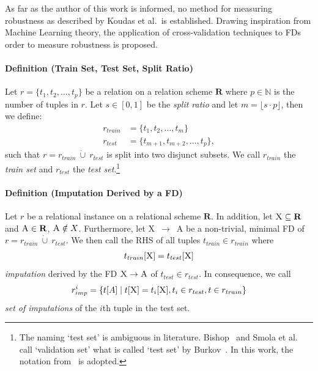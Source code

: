 As far as the author of this work is informed, no method for measuring robustness as described by Koudas et al.\ is established.
Drawing inspiration from Machine Learning theory, the application of cross-validation techniques to FDs order to measure robustness is proposed.

\paragraph{Definition (Train Set, Test Set, Split Ratio)} Let \( r = \{ t_1, t_2, \dots, t_p \}\) be a  relation on a relation scheme \( \boldsymbol{R} \) where \( p \in \mathbb{N} \) is the number of tuples in \( r \).
Let \( s \in [0, 1] \) be the \emph{split ratio} and let \( m = \lfloor s \cdot p \rfloor \), then we define:
\begin{align}
    r_{train} &= \{ t_1, t_2, \dots, t_{m} \} \\
    r_{test} &= \{ t_{m + 1}, t_{m + 2}, \dots, t_{p} \},
\end{align}
such that \( r =  r_{train}~\dot\cup~r_{test} \) is split into two disjunct subsets.
We call \( r_{train} \) the \emph{train set} and \( r_{test} \) the \emph{test set}.\footnote{The naming `test set' is ambiguous in literature. Bishop~\cite{BIS06} and Smola et al.\ \cite{SMO08} call `validation set' what is called `test set' by Burkov~\cite[ch.~5, p.~8-9]{BUR19}. In this work, the notation from~\cite{BUR19} is adopted.}~\cite[p.~56]{SMO08}

\paragraph{Definition (Imputation Derived by a FD)}
Let \( r \) be a relational instance on a relational scheme \( \mathbf{R} \).
In addition, let \( \textsc{X} \subseteq \mathbf{R} \) and \( \textsc{A} \in \mathbf{R} \), \( \textsc{A} \notin X\).
Furthermore, let \textsc{X}~\( \rightarrow \)~\textsc{A} be a non-trivial, minimal FD of \( r = r_{train}~\dot\cup~r_{test}\).
We then call the RHS of all tuples \( t_{train} \in r_{train} \) where
\begin{align}\label{eq:fd-imputation}
    t_{train}[\textsc{X}] = t_{test}[\textsc{X}]
\end{align}
\emph{imputation} derived by the FD \( \textsc{X} \rightarrow \textsc{A} \) of \( t_{test} \in r_{test} \).
In consequence, we call
\begin{align}
    r_{imp}^{i} = \{ t[A] \mid t[\textsc{X}] = t_{i}[\textsc{X}], t_{i} \in r_{test}, t \in r_{train} \}
\end{align}
\emph{set of imputations} of the \( i \)th tuple in the test set.

